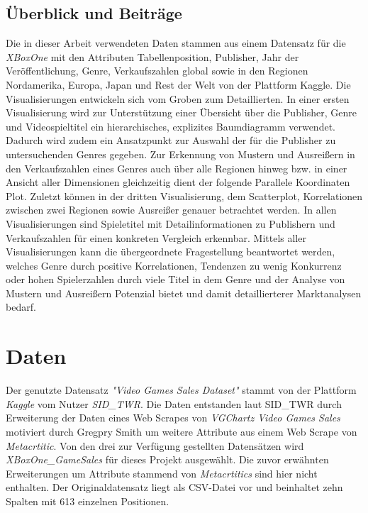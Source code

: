 \documentclass[usegeometry=true]{scrartcl}
\begin{document}
\subsection{Überblick und Beiträge}
Die in dieser Arbeit verwendeten Daten stammen aus einem Datensatz für die \textit{XBoxOne} mit den Attributen Tabellenposition, Publisher, Jahr der Veröffentlichung, Genre, Verkaufszahlen global sowie in den Regionen Nordamerika, Europa, Japan und Rest der Welt von der Plattform Kaggle.\cite{SID_TWR.} 
Die Visualisierungen entwickeln sich vom Groben zum Detaillierten.
In einer ersten Visualisierung wird zur Unterstützung einer Übersicht über die Publisher, Genre und Videospieltitel ein hierarchisches, explizites Baumdiagramm verwendet. 
Dadurch wird zudem ein Ansatzpunkt zur Auswahl der für die Publisher zu untersuchenden Genres gegeben.
Zur Erkennung von Mustern und Ausreißern in den Verkaufszahlen eines Genres auch über alle Regionen hinweg bzw. in einer Ansicht aller Dimensionen gleichzeitig dient der folgende Parallele Koordinaten Plot.
Zuletzt können in der dritten Visualisierung, dem Scatterplot, Korrelationen zwischen zwei Regionen sowie Ausreißer genauer betrachtet werden.
In allen Visualisierungen sind Spieletitel mit Detailinformationen zu Publishern und Verkaufszahlen für einen konkreten Vergleich erkennbar.
Mittels aller Visualisierungen kann die übergeordnete Fragestellung beantwortet werden, welches Genre durch positive Korrelationen, Tendenzen zu wenig Konkurrenz oder hohen Spielerzahlen durch viele Titel in dem Genre und der Analyse von Mustern und Ausreißern Potenzial bietet und damit detaillierterer Marktanalysen bedarf.

\section{Daten}
Der genutzte Datensatz \textit{"Video Games Sales Dataset"} stammt von der Plattform \textit{Kaggle} vom Nutzer \textit{SID\_TWR}.\cite{SID_TWR.} 
Die Daten entstanden laut SID\_TWR durch Erweiterung der Daten eines Web Scrapes von \textit{VGChartz Video Games Sales} motiviert durch Gregpry Smith um weitere Attribute aus einem Web Scrape von \textit{Metacrtitic}.
Von den drei zur Verfügung gestellten Datensätzen wird \textit{XBoxOne\_GameSales} für dieses Projekt ausgewählt. 
Die zuvor erwähnten Erweiterungen um Attribute stammend von \textit{Metacrtitics} sind hier nicht enthalten. 
Der Originaldatensatz liegt als CSV-Datei vor und beinhaltet zehn Spalten mit 613 einzelnen Positionen. 
\end{document}
